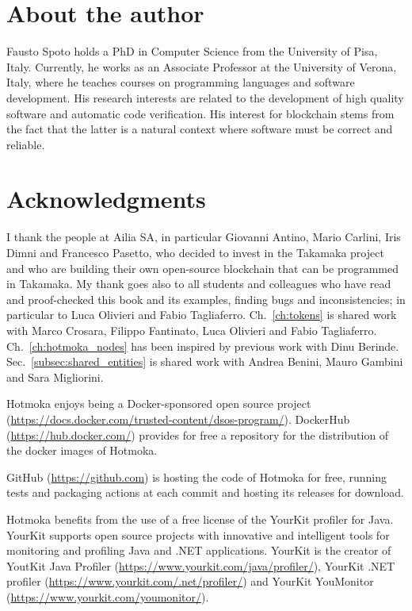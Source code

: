 \section{About the author}\label{sec:about_the_author}

Fausto Spoto holds a PhD in Computer Science from the University of Pisa, Italy.
Currently, he works as an Associate Professor at the University of Verona, Italy, where
he teaches courses on programming languages and software development.
His research interests are related to the development of high quality software
and automatic code verification. His interest for blockchain stems
from the fact that the latter is a natural context where
software must be correct and reliable.

\section{Acknowledgments}

I thank the people at Ailia SA, in particular Giovanni Antino, Mario Carlini,
Iris Dimni and Francesco Pasetto, who decided to invest in the Takamaka project and who are building their own
open-source blockchain that can be programmed in Takamaka. My thank goes also to all students and
colleagues who have read and proof-checked this book and its examples, finding
bugs and inconsistencies; in particular to
Luca Olivieri and Fabio Tagliaferro.
Ch.~\ref{ch:tokens} is shared work with Marco Crosara,
Filippo Fantinato, Luca Olivieri and Fabio Tagliaferro.
Ch.~\ref{ch:hotmoka_nodes} has been
inspired by previous work with Dinu Berinde.
Sec.~\ref{subsec:shared_entities} is shared work
with Andrea Benini, Mauro Gambini and Sara Migliorini.

\begin{center}
\end{center}

Hotmoka enjoys being a Docker-sponsored open source
project (\url{https://docs.docker.com/trusted-content/dsos-program/}).
DockerHub (\url{https://hub.docker.com/}) provides for free
a repository for the distribution of the docker images of Hotmoka.

\begin{center}
\end{center}

GitHub (\url{https://github.com})
is hosting the code of Hotmoka for free, running tests and
packaging actions at each commit and hosting its releases for download.

\begin{center}
\end{center}

Hotmoka benefits from the use of a free license of
the YourKit profiler
for Java. YourKit supports open source projects with innovative and
intelligent tools for monitoring and profiling Java and .NET applications.
YourKit is the creator of YoutKit Java Profiler
(\url{https://www.yourkit.com/java/profiler/}),
YourKit .NET profiler
(\url{https://www.yourkit.com/.net/profiler/})
and YourKit YouMonitor (\url{https://www.yourkit.com/youmonitor/}).
